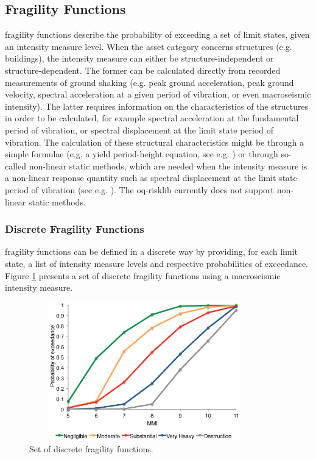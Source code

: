 \subsection{Fragility Functions}
\Glspl{fragility function} describe the probability of exceeding a set of limit states, given an intensity measure level. When the asset category concerns structures (e.g. buildings), the intensity measure can either be structure-independent or structure-dependent. The former can be calculated directly from recorded measurements of ground shaking (e.g. peak ground acceleration, peak ground velocity, spectral acceleration at a given period of vibration, or even macroseismic intensity). The latter requires information on the characteristics of the structures in order to be calculated, for example spectral acceleration at the fundamental period of vibration, or spectral displacement at the limit state period of vibration. The calculation of these structural characteristics might be through a simple formulae (e.g. a yield period-height equation, see e.g. \citet{CrowleyPinho2004} ) or through so-called non-linear static methods, which are needed when the intensity measure is a non-linear response quantity such as spectral displacement at the limit state period of vibration (see e.g. \citet{FEMA440ATC2005}). The oq-risklib currently does not support non-linear static methods.

\subsubsection{Discrete Fragility Functions}
\Glspl{fragility function} can be defined in a discrete way by providing, for each limit state, a list of intensity measure levels and respective probabilities of exceedance. Figure \ref{fig:FFDiscrete} presents a set of discrete \glspl{fragility function} using a macroseismic intensity measure. 

\begin{figure}[ht]
\centering
\includegraphics[width=10cm,height=6cm]{./figures/risk/FFDiscrete.eps}
\caption{Set of discrete fragility functions.}
\label{fig:FFDiscrete}
\end{figure}

